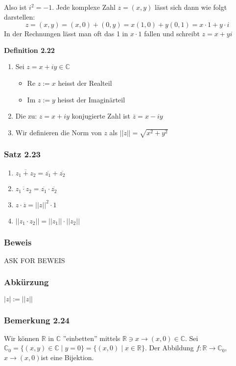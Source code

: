 Also ist $i^2=-1$. Jede komplexe Zahl $z=(x,y)$ lässt sich dann wie folgt darstellen:  $$z=(x,y)=(x,0)+(0,y)=x(1,0)+y(0,1)=x\cdot 1+ y\cdot i$$
In der Rechnungen lässt man oft das 1 in $x\cdot 1$ fallen und schreibt $z=x+yi$
\begin{framed}
\centerline{\textbf{Definition 2.22}}
\begin{enumerate}
\item Sei $z=x+iy\in\mathbb{C}$
\begin{itemize}
\item Re $z:=x$ heisst der Realteil
\item Im $z:=y$ heisst der Imaginärteil 
\end{itemize}
\item Die zu: $z=x+iy$ konjugierte Zahl ist $\overline{z}=x-iy$
\item Wir definieren die Norm von $z$ als $\left|\left| z\right|\right|=\sqrt{x^2+y^2}$
\end{enumerate}
\end{framed}
\subsubsection*{Satz 2.23}
\begin{enumerate}[\indent (i)]
\item $\overline{z_1+z_2}=\overline{z_1}+\overline{z_2}$
\item $\overline{z_1\cdot z_2}=\overline{z_1}\cdot\overline{z_2}$
\item $z\cdot\overline{z}={\left|\left| z\right|\right|}^2\cdot 1$
\item ${\left|\left| z_1\cdot z_2\right|\right|}={\left|\left| z_1\right|\right|}\cdot{\left|\left| z_2\right|\right|}$
\end{enumerate}
\subsubsection*{Beweis}
ASK FOR BEWEIS 
\subsubsection*{Abkürzung}
$\left| z\right| := \left|\left| z \right|\right|$
\subsubsection*{Bemerkung 2.24}
Wir können $\mathbb{R}$ in $\mathbb{C}$ ''einbetten'' mittels $\mathbb{R}\ni x\rightarrow (x,0)\in\mathbb{C}$. Sei $\mathbb{C}_0=\{ (x,y)\in\mathbb{C}\mid y=0 \}=\{ (x,0)\mid x\in\mathbb{R}\}$. Der Abbildung $f:\mathbb{R}\rightarrow\mathbb{C}_0$, $x\rightarrow (x,0)$ist eine Bijektion.\\


